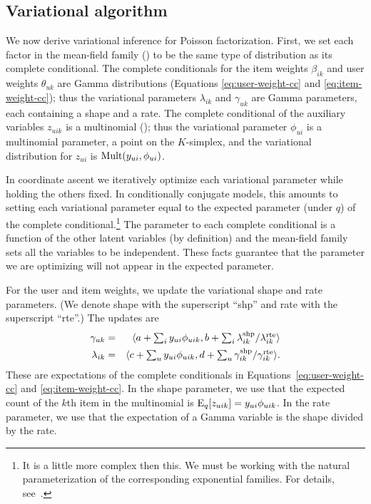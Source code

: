 \documentclass{sig-alternate}
\begin{document}
\subsection{Variational algorithm}

We now derive variational inference for Poisson factorization. First,
we set each factor in the mean-field family () to be the same
type of distribution as its complete conditional.  The complete
conditionals for the item weights $\beta_{ik}$ and user weights
$\theta_{uk}$ are Gamma distributions (Equations
\ref{eq:user-weight-cc} and \ref{eq:item-weight-cc}); thus the
variational parameters $\lambda_{ik}$ and $\gamma_{uk}$ are Gamma
parameters, each containing a shape and a rate.  The complete
conditional of the auxiliary variables $z_{uik}$ is a multinomial
(); thus the variational parameter $\phi_{ui}$ is a
multinomial parameter, a point on the $K$-simplex, and the variational
distribution for $z_{ui}$ is $\textrm{Mult}(y_{ui}, \phi_{ui})$.

In coordinate ascent we iteratively optimize each variational
parameter while holding the others fixed.  In conditionally conjugate
models, this amounts to setting each variational parameter equal to
the expected parameter (under $q$) of the complete
conditional.\footnote{It is a little more complex then this.  We must
  be working with the natural parameterization of the corresponding
  exponential families.  For details, see~\cite{Hoffman:2013}.}  The
parameter to each complete conditional is a function of the other
latent variables (by definition) and the mean-field family sets all
the variables to be independent.  These facts guarantee that the
parameter we are optimizing will not appear in the expected parameter.


For the user and item weights, we update the variational shape and
rate parameters.  (We denote shape with the superscript ``shp'' and
rate with the superscript ``rte''.) The updates are
\begin{eqnarray}
  \gamma_{uk} &=& \langle a + \textstyle \sum_{i} y_{ui} \phi_{uik},
  b + \textstyle \sum_i \lambda_{ik}^{\textrm{shp}} / \lambda_{ik}^{\textrm{rte}} \rangle \\
  \lambda_{ik} &=& \langle c + \textstyle \sum_{u} y_{ui} \phi_{uik},
  d + \textstyle \sum_u \gamma_{ik}^{\textrm{shp}} / \gamma_{ik}^{\textrm{rte}} \rangle.
\end{eqnarray}
These are expectations of the complete conditionals in
Equations~\ref{eq:user-weight-cc} and \ref{eq:item-weight-cc}.  In the
shape parameter, we use that the expected count of the $k$th item in
the multinomial is $\textrm{E}_q[z_{uik}] = y_{ui} \phi_{uik}$. In the rate
parameter, we use that the expectation of a Gamma variable is the
shape divided by the rate.
\end{document}
